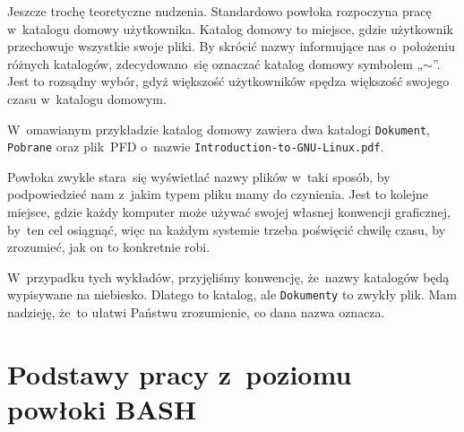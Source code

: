 \documentclass[10pt,t]{beamer}
\begin{document}
\begin{frame}
  Jeszcze trochę teoretyczne nudzenia. Standardowo powłoka rozpoczyna pracę
  w~katalogu domowy użytkownika. Katalog domowy to miejsce, gdzie użytkownik
  przechowuje wszystkie swoje pliki. By skrócić nazwy informujące nas
  o~położeniu różnych katalogów, zdecydowano~się oznaczać katalog domowy
  symbolem „$\sim$”. Jest to rozsądny wybór, gdyż większość użytkowników
  spędza większość swojego czasu w~katalogu domowym.



  W~omawianym przykładzie katalog domowy zawiera dwa katalogi
  \texttt{Dokument}, \texttt{Pobrane} oraz plik~PFD o~nazwie
  \texttt{Introduction-to-GNU-Linux.pdf}.

  Powłoka zwykle stara~się wyświetlać nazwy plików w~taki sposób, by
  podpowiedzieć nam z~jakim typem pliku mamy do czynienia. Jest to kolejne
  miejsce, gdzie każdy komputer może używać swojej własnej konwencji
  graficznej, by~ten cel osiągnąć, więc na każdym systemie trzeba poświęcić
  chwilę czasu, by zrozumieć, jak on to konkretnie robi.

  W~przypadku tych wykładów, przyjęliśmy konwencję, że~nazwy katalogów
  będą wypisywane na niebiesko. Dlatego \texttt{}
  to katalog, ale \texttt{Dokumenty} to zwykły plik. Mam nadzieję, że~to
  ułatwi Państwu zrozumienie, co dana nazwa oznacza.

\end{frame}





\section{Podstawy pracy z~poziomu powłoki BASH}
\end{document}

